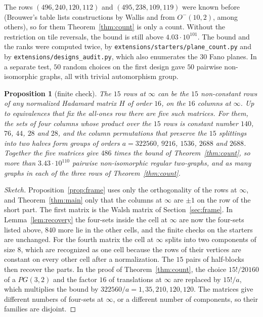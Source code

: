 \documentclass[11pt]{amsart}
\newtheorem{proposition}[theorem]{Proposition}
\theoremstyle{remark}
\begin{document}
The rows $(496,240,120,112)$ and $(495,238,109,119)$ were known before (Brouwer's table lists constructions by Wallis and from $O^-(10,2)$, among others), so for them Theorem~\ref{thm:count} is only a count. Without the restriction on tile reversals, the bound is still above $4.03\cdot10^{101}$. The bound and the ranks were computed twice, by \texttt{extensions/starters/plane\_count.py} and by \texttt{extensions/designs\_audit.py}, which also enumerates the $30$ Fano planes. In a separate test, $50$ random choices on the first design gave $50$ pairwise non-isomorphic graphs, all with trivial automorphism group.

\begin{proposition}[finite check]\label{prop:hadamard}
The $15$ rows at $\infty$ can be the $15$ non-constant rows of any normalized Hadamard matrix $H$ of order $16$, on the $16$ columns at $\infty$. Up to equivalences that fix the all-ones row there are five such matrices. For them, the sets of four columns whose product over the $15$ rows is constant number $140$, $76$, $44$, $28$ and $28$, and the column permutations that preserve the $15$ splittings into two halves form groups of orders $a=322560$, $9216$, $1536$, $2688$ and $2688$. Together the five matrices give $486$ times the bound of Theorem~\ref{thm:count}, so more than $3.43\cdot10^{110}$ pairwise non-isomorphic regular two-graphs, and as many graphs in each of the three rows of Theorem~\ref{thm:count}.
\end{proposition}

\begin{proof}[Sketch]
Proposition~\ref{prop:frame} uses only the orthogonality of the rows at $\infty$, and Theorem~\ref{thm:main} only that the columns at $\infty$ are $\pm1$ on the row of the short part. The first matrix is the Walsh matrix of Section~\ref{sec:frame}. In Lemma~\ref{lem:recovery} the four-sets inside the cell at $\infty$ are now the four-sets listed above, $840$ more lie in the other cells, and the finite checks on the starters are unchanged. For the fourth matrix the cell at $\infty$ splits into two components of size $8$, which are recognized as one cell because the rows of their vertices are constant on every other cell after a normalization. The $15$ pairs of half-blocks then recover the parts. In the proof of Theorem~\ref{thm:count}, the choice $15!/20160$ of a $PG(3,2)$ and the factor $16$ of translations at $\infty$ are replaced by $15!/a$, which multiplies the bound by $322560/a=1,35,210,120,120$. The matrices give different numbers of four-sets at $\infty$, or a different number of components, so their families are disjoint.
\end{proof}
\end{document}
